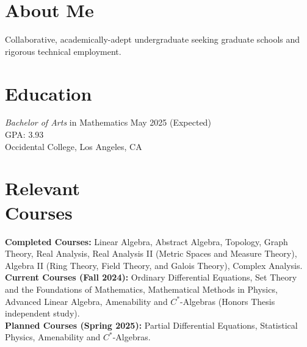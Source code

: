 \documentclass[margin, 12pt]{res} %
\begin{document}
\begin{resume}

\section{\sc About Me}
Collaborative, academically-adept undergraduate seeking graduate schools and rigorous technical employment.

\section{\sc Education}

{\sl Bachelor of Arts} in Mathematics \hfill May 2025 (Expected) \\
GPA: 3.93\\
Occidental College, Los Angeles, CA 
\section{\sc Relevant \\ Courses}

\textbf{Completed Courses:} Linear Algebra, Abstract Algebra, Topology, Graph Theory, Real Analysis, Real Analysis II (Metric Spaces and Measure Theory), Algebra II (Ring Theory, Field Theory, and Galois Theory), Complex Analysis.\\

\textbf{Current Courses (Fall 2024):} Ordinary Differential Equations, Set Theory and the Foundations of Mathematics, Mathematical Methods in Physics, Advanced Linear Algebra, Amenability and $C^{\ast}$-Algebras (Honors Thesis independent study).\\

\textbf{Planned Courses (Spring 2025):} Partial Differential Equations, Statistical Physics, Amenability and $C^{\ast}$-Algebras.

\end{resume}
\end{document}
